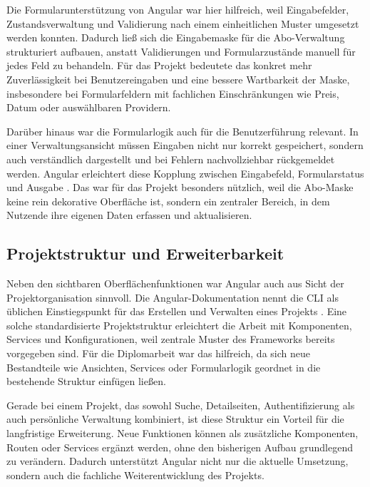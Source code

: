 Die Formularunterst\"utzung von Angular war hier hilfreich, weil Eingabefelder, Zustandsverwaltung und Validierung nach einem einheitlichen Muster umgesetzt werden konnten. Dadurch lie\ss{} sich die Eingabemaske f\"ur die Abo-Verwaltung strukturiert aufbauen, anstatt Validierungen und Formularzust\"ande manuell f\"ur jedes Feld zu behandeln. F\"ur das Projekt bedeutete das konkret mehr Zuverl\"assigkeit bei Benutzereingaben und eine bessere Wartbarkeit der Maske, insbesondere bei Formularfeldern mit fachlichen Einschr\"ankungen wie Preis, Datum oder ausw\"ahlbaren Providern.

Dar\"uber hinaus war die Formularlogik auch f\"ur die Benutzerf\"uhrung relevant. In einer Verwaltungsansicht m\"ussen Eingaben nicht nur korrekt gespeichert, sondern auch verst\"andlich dargestellt und bei Fehlern nachvollziehbar r\"uckgemeldet werden. Angular erleichtert diese Kopplung zwischen Eingabefeld, Formularstatus und Ausgabe \cite{angular_forms}. Das war f\"ur das Projekt besonders n\"utzlich, weil die Abo-Maske keine rein dekorative Oberfl\"ache ist, sondern ein zentraler Bereich, in dem Nutzende ihre eigenen Daten erfassen und aktualisieren.

\subsection{Projektstruktur und Erweiterbarkeit}
Neben den sichtbaren Oberfl\"achenfunktionen war Angular auch aus Sicht der Projektorganisation sinnvoll. Die Angular-Dokumentation nennt die CLI als \"ublichen Einstiegspunkt f\"ur das Erstellen und Verwalten eines Projekts \cite{angular_cli}. Eine solche standardisierte Projektstruktur erleichtert die Arbeit mit Komponenten, Services und Konfigurationen, weil zentrale Muster des Frameworks bereits vorgegeben sind. F\"ur die Diplomarbeit war das hilfreich, da sich neue Bestandteile wie Ansichten, Services oder Formularlogik geordnet in die bestehende Struktur einf\"ugen lie\ss{}en.

Gerade bei einem Projekt, das sowohl Suche, Detailseiten, Authentifizierung als auch pers\"onliche Verwaltung kombiniert, ist diese Struktur ein Vorteil f\"ur die langfristige Erweiterung. Neue Funktionen k\"onnen als zus\"atzliche Komponenten, Routen oder Services erg\"anzt werden, ohne den bisherigen Aufbau grundlegend zu ver\"andern. Dadurch unterst\"utzt Angular nicht nur die aktuelle Umsetzung, sondern auch die fachliche Weiterentwicklung des Projekts.


